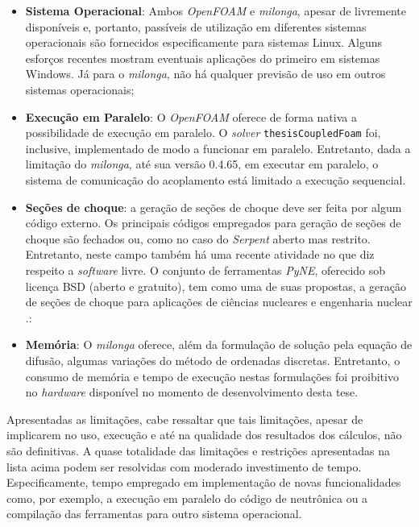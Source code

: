 \begin{itemize}
\item \textbf{Sistema Operacional}: Ambos \textit{OpenFOAM} e \textit{milonga}, apesar de livremente disponíveis e,
  portanto, passíveis de utilização em diferentes sistemas operacionais são fornecidos especificamente
  para sistemas Linux. Alguns esforços recentes mostram eventuais aplicações do primeiro em sistemas
  Windows. Já para o \textit{milonga}, não há qualquer previsão de uso em outros sistemas operacionais;
\item \textbf{Execução em Paralelo}: O \textit{OpenFOAM} oferece de forma nativa a possibilidade de execução em
  paralelo. O \textit{solver} \texttt{thesisCoupledFoam} foi, inclusive, implementado de modo a funcionar em paralelo.
  Entretanto, dada a limitação do \textit{milonga}, até sua versão 0.4.65, em executar em paralelo, o sistema
  de comunicação do acoplamento está limitado a execução sequencial.
\item \textbf{Seções de choque}: a geração de seções de choque deve ser feita por algum código externo. Os
  principais códigos empregados para geração de seções de choque são fechados ou, como no
  caso do \textit{Serpent} aberto mas restrito. Entretanto, neste campo também há uma recente
  atividade no que diz respeito a \textit{software} livre. O conjunto de ferramentas \textit{PyNE},
  oferecido sob licença BSD (aberto e gratuito), tem como uma de suas propostas, a geração de seções
  de choque para aplicações de ciências nucleares e engenharia nuclear \cite{Slaybaugh2014}.:
\item \textbf{Memória}: O \textit{milonga} oferece, além da formulação de solução pela equação de difusão,
  algumas variações do método de ordenadas discretas. Entretanto, o consumo de memória e tempo de execução
  nestas formulações foi proibitivo no \textit{hardware} disponível no momento de desenvolvimento desta tese.
\end{itemize}

Apresentadas as limitações, cabe ressaltar que tais limitações, apesar de implicarem no uso,
execução e até na qualidade dos resultados dos cálculos, não são definitivas.
A quase totalidade das limitações e restrições apresentadas na lista
acima podem ser resolvidas com moderado investimento de tempo. Especificamente, tempo empregado em implementação
de novas funcionalidades como, por exemplo, a execução em paralelo do código de neutrônica ou a compilação
das ferramentas para outro sistema operacional.

